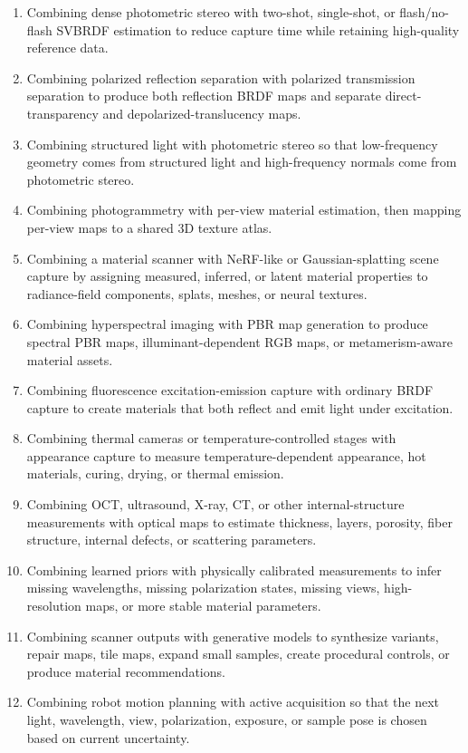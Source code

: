 \documentclass[11pt, twoside, listof=totocnumbered, bibliography=totocnumbered]{scrartcl}
\begin{document}
	\begin{enumerate}
		\item Combining dense photometric stereo with two-shot, single-shot, or flash/no-flash SVBRDF estimation to reduce capture time while retaining high-quality reference data.
		\item Combining polarized reflection separation with polarized transmission separation to produce both reflection BRDF maps and separate direct-transparency and depolarized-translucency maps.
		\item Combining structured light with photometric stereo so that low-frequency geometry comes from structured light and high-frequency normals come from photometric stereo.
		\item Combining photogrammetry with per-view material estimation, then mapping per-view maps to a shared 3D texture atlas.
		\item Combining a material scanner with NeRF-like or Gaussian-splatting scene capture by assigning measured, inferred, or latent material properties to radiance-field components, splats, meshes, or neural textures.
		\item Combining hyperspectral imaging with PBR map generation to produce spectral PBR maps, illuminant-dependent RGB maps, or metamerism-aware material assets.
		\item Combining fluorescence excitation-emission capture with ordinary BRDF capture to create materials that both reflect and emit light under excitation.
		\item Combining thermal cameras or temperature-controlled stages with appearance capture to measure temperature-dependent appearance, hot materials, curing, drying, or thermal emission.
		\item Combining OCT, ultrasound, X-ray, CT, or other internal-structure measurements with optical maps to estimate thickness, layers, porosity, fiber structure, internal defects, or scattering parameters.
		\item Combining learned priors with physically calibrated measurements to infer missing wavelengths, missing polarization states, missing views, high-resolution maps, or more stable material parameters.
		\item Combining scanner outputs with generative models to synthesize variants, repair maps, tile maps, expand small samples, create procedural controls, or produce material recommendations.
		\item Combining robot motion planning with active acquisition so that the next light, wavelength, view, polarization, exposure, or sample pose is chosen based on current uncertainty.

\end{enumerate}
\end{document}
